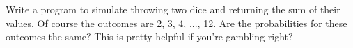 Write a program to simulate throwing two dice and returning the sum of their
values.
Of course the outcomes are 2, 3, 4, ..., 12.
Are the probabilities for these outcomes the same?
This is pretty helpful if you're gambling right?
